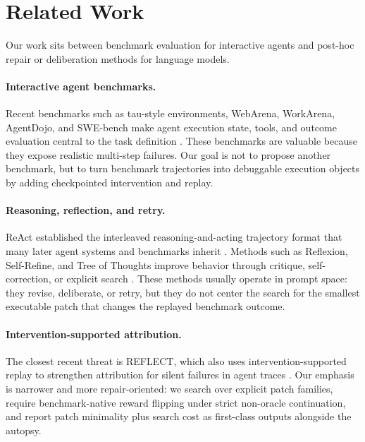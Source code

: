 \documentclass[11pt]{article}
\begin{document}
\section{Related Work}

Our work sits between benchmark evaluation for interactive agents and
post-hoc repair or deliberation methods for language models.

\paragraph{Interactive agent benchmarks.}
Recent benchmarks such as tau-style environments, WebArena, WorkArena,
AgentDojo, and SWE-bench make agent execution state, tools, and outcome
evaluation central to the task definition
\citep{tau_style,web_arena,work_arena,agent_dojo,swe_bench}. These benchmarks
are valuable because they expose realistic multi-step failures. Our goal is not
to propose another benchmark, but to turn benchmark trajectories into
debuggable execution objects by adding checkpointed intervention and replay.

\paragraph{Reasoning, reflection, and retry.}
ReAct established the interleaved reasoning-and-acting trajectory format that
many later agent systems and benchmarks inherit \citep{react}. Methods such as
Reflexion, Self-Refine, and Tree of Thoughts improve behavior through critique,
self-correction, or explicit search \citep{reflexion,self_refine,tree_of_thoughts}.
These methods usually operate in prompt space: they revise, deliberate, or
retry, but they do not center the search for the smallest executable patch that
changes the replayed benchmark outcome.

\paragraph{Intervention-supported attribution.}
The closest recent threat is REFLECT, which also uses intervention-supported
replay to strengthen attribution for silent failures in agent traces
\citep{reflect}. Our emphasis is narrower and more repair-oriented: we search
over explicit patch families, require benchmark-native reward flipping under
strict non-oracle continuation, and report patch minimality plus search cost as
first-class outputs alongside the autopsy.
\end{document}
